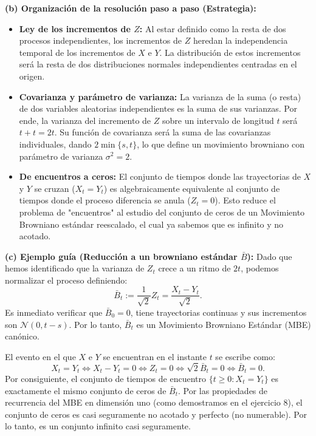 \documentclass[11pt, letterpaper]{article}
\begin{document}
\vspace{5mm}

\begin{solucion}
    \textbf{(b) Organización de la resolución paso a paso (Estrategia):}
    \begin{itemize}
        \item[(i)] \textbf{Ley de los incrementos de $Z$:} Al estar definido como la resta de dos procesos independientes, los incrementos de $Z$ heredan la independencia temporal de los incrementos de $X$ e $Y$. La distribución de estos incrementos será la resta de dos distribuciones normales independientes centradas en el origen.
        \item[(ii)] \textbf{Covarianza y parámetro de varianza:} La varianza de la suma (o resta) de dos variables aleatorias independientes es la suma de sus varianzas. Por ende, la varianza del incremento de $Z$ sobre un intervalo de longitud $t$ será $t + t = 2t$. Su función de covarianza será la suma de las covarianzas individuales, dando $2\min\{s,t\}$, lo que define un movimiento browniano con parámetro de varianza $\sigma^2 = 2$.
        \item[(iii)] \textbf{De encuentros a ceros:} El conjunto de tiempos donde las trayectorias de $X$ y $Y$ se cruzan ($X_t = Y_t$) es algebraicamente equivalente al conjunto de tiempos donde el proceso diferencia se anula ($Z_t = 0$). Esto reduce el problema de "encuentros" al estudio del conjunto de ceros de un Movimiento Browniano estándar reescalado, el cual ya sabemos que es infinito y no acotado.
    \end{itemize}

    \vspace{3mm}
    \textbf{(c) Ejemplo guía (Reducción a un browniano estándar $\bar{B}$):}
    Dado que hemos identificado que la varianza de $Z_t$ crece a un ritmo de $2t$, podemos normalizar el proceso definiendo:
    \[ \bar{B}_t := \frac{1}{\sqrt{2}} Z_t = \frac{X_t - Y_t}{\sqrt{2}}. \]
    Es inmediato verificar que $\bar{B}_0 = 0$, tiene trayectorias continuas y sus incrementos son $\mathcal{N}(0, t-s)$. Por lo tanto, $\bar{B}_t$ es un Movimiento Browniano Estándar (MBE) canónico.
    
    El evento en el que $X$ e $Y$ se encuentran en el instante $t$ se escribe como:
    \[ X_t = Y_t \iff X_t - Y_t = 0 \iff Z_t = 0 \iff \sqrt{2}\bar{B}_t = 0 \iff \bar{B}_t = 0. \]
    Por consiguiente, el conjunto de tiempos de encuentro $\{t \ge 0 : X_t = Y_t\}$ es exactamente el mismo conjunto de ceros de $\bar{B}_t$. Por las propiedades de recurrencia del MBE en dimensión uno (como demostramos en el ejercicio 8), el conjunto de ceros es casi seguramente no acotado y perfecto (no numerable). Por lo tanto, es un conjunto infinito casi seguramente.


\end{solucion}
\end{document}
